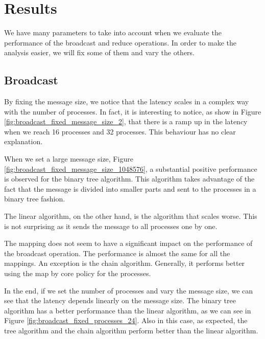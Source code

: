 \section{Results}

We have many parameters to take into account when we evaluate the performance of the broadcast and reduce operations. In order to make the analysis easier, we will fix some of them and vary the others.

\subsection{Broadcast}

By fixing the message size, we notice that the latency scales in a complex way with the number of processes. In fact, it is interesting to notice, as show in Figure \ref{fig:broadcast_fixed_message_size_2}, that there is a ramp up in the latency when we reach 16 processes and 32 processes. This behaviour has no clear explanation.

When we set a large message size, Figure \ref{fig:broadcast_fixed_message_size_1048576}, a substantial positive performance is observed for the binary tree algorithm. This algorithm takes advantage of the fact that the message is divided into smaller parts and sent to the processes in a binary tree fashion.

The linear algorithm, on the other hand, is the algorithm that scales worse. This is not surprising as it sends the message to all processes one by one.

The mapping does not seem to have a significant impact on the performance of the broadcast operation. The performance is almost the same for all the mappings. An exception is the chain algorithm. Generally, it performs better using the map by core policy for the processes.

In the end, if we set the number of processes and vary the message size, we can see that the latency depends linearly on the message size. The binary tree algorithm has a better performance than the linear algorithm, as we can see in Figure \ref{fig:broadcast_fixed_processes_24}. Also in this case, as expected, the tree algorithm and the chain algorithm perform better than the linear algorithm.



